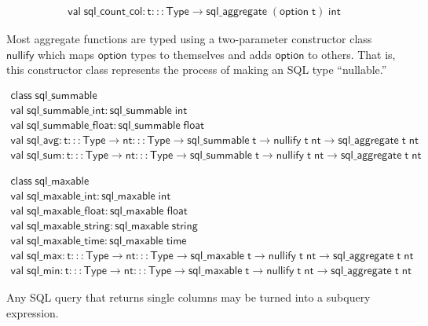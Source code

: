 \documentclass{article}
\newcommand{\mt}[1]{\mathsf{#1}}
\begin{document}
$$\begin{array}{l}
  \mt{val} \; \mt{sql\_count\_col} : \mt{t} ::: \mt{Type} \to \mt{sql\_aggregate} \; (\mt{option} \; \mt{t}) \; \mt{int}
\end{array}$$

Most aggregate functions are typed using a two-parameter constructor class $\mt{nullify}$ which maps $\mt{option}$ types to themselves and adds $\mt{option}$ to others.  That is, this constructor class represents the process of making an SQL type ``nullable.''
 
$$\begin{array}{l}
  \mt{class} \; \mt{sql\_summable} \\
  \mt{val} \; \mt{sql\_summable\_int} : \mt{sql\_summable} \; \mt{int} \\
  \mt{val} \; \mt{sql\_summable\_float} : \mt{sql\_summable} \; \mt{float} \\
  \mt{val} \; \mt{sql\_avg} : \mt{t} ::: \mt{Type} \to \mt{nt} ::: \mt{Type} \to \mt{sql\_summable} \; \mt{t} \to \mt{nullify} \; \mt{t} \; \mt{nt} \to \mt{sql\_aggregate} \; \mt{t} \; \mt{nt} \\
  \mt{val} \; \mt{sql\_sum} : \mt{t} ::: \mt{Type} \to \mt{nt} ::: \mt{Type} \to \mt{sql\_summable} \; \mt{t} \to \mt{nullify} \; \mt{t} \; \mt{nt} \to \mt{sql\_aggregate} \; \mt{t} \; \mt{nt}
\end{array}$$

$$\begin{array}{l}
  \mt{class} \; \mt{sql\_maxable} \\
  \mt{val} \; \mt{sql\_maxable\_int} : \mt{sql\_maxable} \; \mt{int} \\
  \mt{val} \; \mt{sql\_maxable\_float} : \mt{sql\_maxable} \; \mt{float} \\
  \mt{val} \; \mt{sql\_maxable\_string} : \mt{sql\_maxable} \; \mt{string} \\
  \mt{val} \; \mt{sql\_maxable\_time} : \mt{sql\_maxable} \; \mt{time} \\
  \mt{val} \; \mt{sql\_max} : \mt{t} ::: \mt{Type} \to \mt{nt} ::: \mt{Type} \to \mt{sql\_maxable} \; \mt{t} \to \mt{nullify} \; \mt{t} \; \mt{nt} \to \mt{sql\_aggregate} \; \mt{t} \; \mt{nt} \\
  \mt{val} \; \mt{sql\_min} : \mt{t} ::: \mt{Type} \to \mt{nt} ::: \mt{Type} \to \mt{sql\_maxable} \; \mt{t} \to \mt{nullify} \; \mt{t} \; \mt{nt} \to \mt{sql\_aggregate} \; \mt{t} \; \mt{nt}
\end{array}$$

Any SQL query that returns single columns may be turned into a subquery expression.
\end{document}
